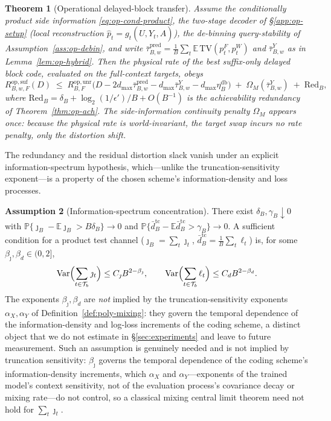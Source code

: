 \documentclass[11pt]{article}
\newcommand{\E}{\mathbb{E}}
\newcommand{\Prob}{\mathbb{P}}
\newcommand{\phat}{\hat{p}}
\newcommand{\TV}{\mathrm{TV}}
\theoremstyle{plain}
\newtheorem{theorem}{Theorem}[section]
\theoremstyle{definition}
\newtheorem{assumption}[theorem]{Assumption}
\theoremstyle{remark}
\begin{document}
\begin{theorem}[Operational delayed-block transfer]
\label{thm:op-transfer}
Assume the conditionally product side information
\eqref{eq:op-cond-product}, the two-stage decoder of
\S\ref{app:op-setup} (local reconstruction $\phat_t=g_t(\hat U,Y_t,A)$),
the de-binning query-stability of Assumption~\ref{ass:op-debin}, and
write
$\bar\tau^{\mathrm{pred}}_{B,w}=\tfrac1B\sum_t\E\,\TV(p_t^F,p_t^W)$ and
$\bar\tau^{Y}_{B,w}$ as in Lemma~\ref{lem:op-hybrid}. Then the
physical rate of the best suffix-only delayed block code, evaluated
on the full-context targets, obeys
\begin{equation}
\label{eq:op-transfer}
R^{\mathrm{op,suf}}_{B,w,F}(D)\;\le\;
R^{\mathrm{op,unr}}_{B,F}\!\bigl(D-2d_{\max}\bar\tau^{\mathrm{pred}}_{B,w}-d_{\max}\bar\tau^{Y}_{B,w}-d_{\max}\eta_B^{\mathrm{db}}\bigr)
\;+\;\Omega_M(\bar\tau^{Y}_{B,w})\;+\;\mathrm{Red}_B,
\end{equation}
where $\mathrm{Red}_B=\delta_B+\log_2(1/\epsilon')/B+O(B^{-1})$ is the
achievability redundancy of Theorem~\ref{thm:op-ach}. The
side-information continuity penalty $\Omega_M$ appears \emph{once}:
because the physical rate is world-invariant, the target swap incurs
no rate penalty, only the distortion shift.
\end{theorem}

The redundancy and the residual distortion slack vanish under an
explicit information-spectrum hypothesis, which---unlike the
truncation-sensitivity exponent---is a property of the chosen scheme's
information-density and loss processes.

\begin{assumption}[Information-spectrum concentration]
\label{ass:op-spectrum}
There exist $\delta_B,\gamma_B\downarrow0$ with
$\Prob\{\jmath_B-\E\jmath_B>B\delta_B\}\to0$ and
$\Prob\{\bar d_B^{\mathrm{tc}}-\E\bar d_B^{\mathrm{tc}}>\gamma_B\}\to0$.
A sufficient condition for a product test channel
($\jmath_B=\sum_t\jmath_t$, $\bar d_B^{\mathrm{tc}}=\tfrac1B\sum_t\ell_t$)
is, for some $\beta_\jmath,\beta_d\in(0,2]$,
\[
\operatorname{Var}\Bigl(\sum_{t\in\mathcal T_b}\jmath_t\Bigr)\le C_\jmath B^{2-\beta_\jmath},
\qquad
\operatorname{Var}\Bigl(\sum_{t\in\mathcal T_b}\ell_t\Bigr)\le C_d B^{2-\beta_d}.
\]
The exponents $\beta_\jmath,\beta_d$ are \emph{not} implied by the
truncation-sensitivity exponents $\alpha_X,\alpha_Y$ of
Definition~\ref{def:poly-mixing}: they govern the temporal dependence
of the information-density and log-loss increments of the coding
scheme, a distinct object that we do not estimate in
\S\ref{sec:experiments} and leave to future measurement. Such an
assumption is genuinely needed and is not implied by truncation
sensitivity: $\beta_\jmath$ governs the temporal dependence of the
coding scheme's information-density increments, which $\alpha_X$ and
$\alpha_Y$---exponents of the trained model's context sensitivity, not
of the evaluation process's covariance decay or mixing rate---do not
control, so a classical mixing central limit theorem need not hold for
$\sum_t\jmath_t$.
\end{assumption}
\end{document}
